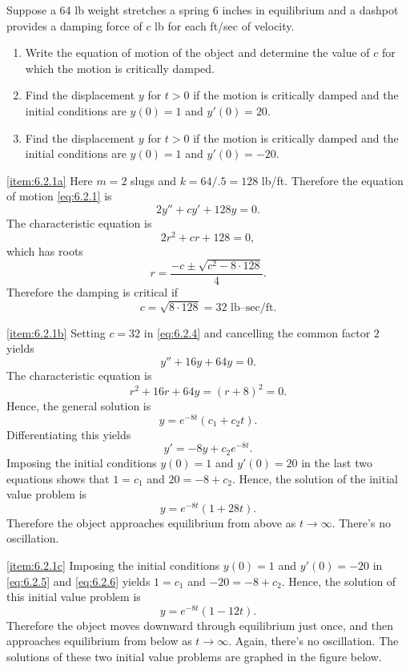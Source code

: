 \documentclass{ximera}
\begin{document}
\begin{example}\label{example:6.2.1}
Suppose a 64 lb weight stretches a spring 6 inches in equilibrium
and a dashpot provides a damping force of $c$ lb for each ft/sec of
velocity.
\begin{enumerate}
\item\label{item:6.2.1a} %
 Write the equation of motion of the object and determine the value of
$c$ for which the motion is critically damped.
\item\label{item:6.2.1b} %
 Find the displacement $y$ for $t>0$ if the motion is critically damped
and the initial conditions are $y(0)=1$ and $y'(0)=20$.
\item\label{item:6.2.1c} %
 Find the displacement $y$ for $t>0$ if the motion is critically damped
and the initial conditions are $y(0)=1$ and $y'(0)=-20$.
\end{enumerate}
 
\begin{explanation}\ref{item:6.2.1a}  Here $m=2$ slugs and $k=64/.5=128$
lb/ft. Therefore the equation of motion  \eqref{eq:6.2.1} is
\begin{equation}\label{eq:6.2.4}
2y''+cy'+128y=0.
\end{equation}
The characteristic equation  is
$$
2r^2+cr+128=0,
$$
which has  roots
$$
r=\frac{-c\pm\sqrt{c^2-8\cdot128}}{4}.
$$
Therefore the damping is critical if
$$
c=\sqrt{8\cdot128}=32\mbox{ lb--sec/ft}.
$$
 
\ref{item:6.2.1b}
 Setting $c=32$ in  \eqref{eq:6.2.4} and cancelling the common factor $2$
yields
$$
y''+16y+64y=0.
$$
The characteristic equation  is
$$
r^2+16r+64y=(r+8)^2=0.
$$
Hence, the general solution is
\begin{equation}\label{eq:6.2.5}
y=e^{-8t}(c_1+c_2t).
\end{equation}
 Differentiating this yields
\begin{equation}\label{eq:6.2.6}
y'=-8y+c_2e^{-8t}.
\end{equation}
Imposing the initial conditions $y(0)=1$ and $y'(0)=20$ in the last
two equations shows that $1=c_1$ and $20=-8+c_2$. Hence, the solution
of the initial value problem is
$$
y=e^{-8t}(1+28t).
$$
Therefore the object approaches equilibrium from above as
$t\rightarrow\infty$. There's no oscillation.
 
\ref{item:6.2.1c}
Imposing the initial conditions $y(0)=1$ and $y'(0)=-20$ in
\eqref{eq:6.2.5} and \eqref{eq:6.2.6} yields $1=c_1$ and $-20=-8+c_2$. Hence,
the solution of this initial value problem is
$$
y=e^{-8t}(1-12t).
$$
Therefore the object moves downward through equilibrium just once,
and then approaches equilibrium from below as $t\rightarrow\infty$. Again,
there's no oscillation. The solutions of these two initial value
problems are graphed in the figure below.


\end{explanation}
\end{example}
\end{document}
